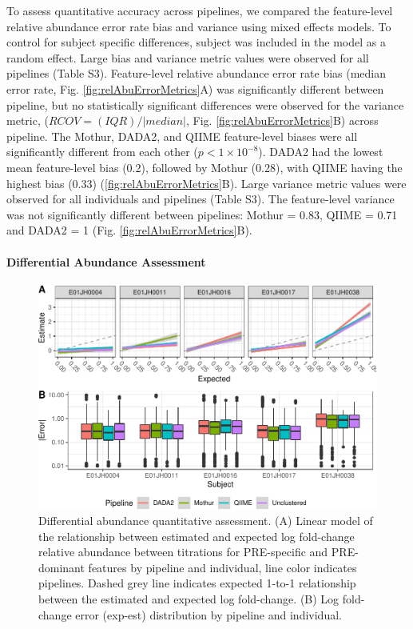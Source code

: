 \documentclass{bmcart}
\begin{document}
To assess quantitative accuracy across pipelines, we compared the feature-level relative
abundance error rate bias and variance
using mixed effects models. To control for subject specific differences, 
subject was included in the model as a random effect.
Large bias and variance metric values were
observed for all pipelines (Table S3).
Feature-level relative abundance error rate bias (median error rate, Fig.
\ref{fig:relAbuErrorMetrics}A) was significantly different between
pipeline, but no statistically significant differences were observed
for the variance metric, (\(RCOV=(IQR)/|median|\), Fig.
\ref{fig:relAbuErrorMetrics}B) across pipeline. The Mothur, DADA2,
and QIIME feature-level biases were all significantly different from
each other (\(p < 1\times 10^{-8}\)). DADA2 had the lowest mean
feature-level bias (0.2), followed by Mothur (0.28), with QIIME having the highest bias
(0.33) (\ref{fig:relAbuErrorMetrics}B). Large variance metric values
were observed for all individuals and pipelines (Table S3). The feature-level variance was not
significantly different between pipelines: Mothur = 0.83, QIIME = 0.71
and DADA2 = 1 (Fig. \ref{fig:relAbuErrorMetrics}B).

\paragraph{Differential Abundance Assessment}
\begin{figure}
\centering
\includegraphics{logFCerror-1.pdf}
\caption{\label{fig:logFCerror} Differential abundance quantitative assessment. (A) Linear model of the relationship between
estimated and expected log fold-change relative abundance between titrations for PRE-specific and
PRE-dominant features by pipeline and individual, line color indicates
pipelines. Dashed grey line indicates expected 1-to-1 relationship
between the estimated and expected log fold-change. (B) Log fold-change
error (\textbar{}exp-est\textbar{}) distribution by pipeline and
individual.}
\end{figure}
\end{document}

